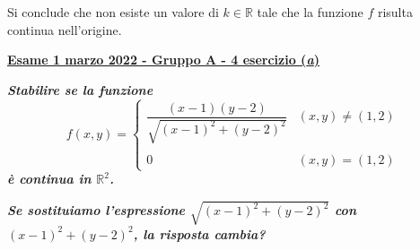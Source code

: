\documentclass[a4paper]{article}
\newcommand{\definition}[1]{\textcolor{Red3}{\textbf{#1}}}
\newcommand{\example}[1]{\textcolor{Green4}{\textbf{#1}}}
\begin{document}
	Si conclude che non esiste un valore di $k \in \mathbb{R}$ tale che la funzione $f$ risulta continua nell'origine.

	\newpage

	\begin{flushleft}
		\label{exam: esame 01 marzo 2022 - Gruppo A - 4 esercizio (a)}
		\hypertarget{
			exam: esame 01 marzo 2022 - Gruppo A - 4 esercizio (a)
		}{
			\definition{\underline{Esame 1 marzo 2022 - Gruppo A - 4 esercizio (\emph{a})}}
		}
	\end{flushleft}
	\example{\emph{Stabilire se la funzione}
	\begin{equation*}
		f\left(x,y\right) = \begin{cases}
			\dfrac{\left(x-1\right)\left(y-2\right)}{\sqrt{\left(x-1\right)^{2} + \left(y-2\right)^{2}}} & \left(x,y\right) \ne \left(1,2\right) \\
			\\
			0 & \left(x,y\right) = \left(1,2\right)
		\end{cases}
	\end{equation*}
	\emph{è continua in $\mathbb{R}^{2}$.}}

	\noindent
	\example{\emph{Se sostituiamo l'espressione $\sqrt{\left(x-1\right)^{2} + \left(y-2\right)^{2}}$ con $\left(x-1\right)^{2} + \left(y-2\right)^{2}$, la risposta cambia?}}\newline
\end{document}
